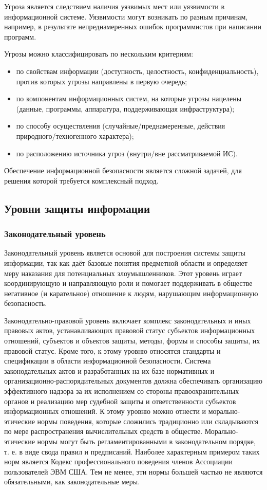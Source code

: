 Угроза является следствием наличия уязвимых мест или уязвимости в
информационной системе. Уязвимости могут возникать по разным причинам,
например, в результате непреднамеренных ошибок программистов при написании
программ.

\noindent Угрозы можно классифицировать по нескольким критериям:
\begin{itemize}
  \item по свойствам информации (доступность, целостность,
      конфиденциальность), против которых угрозы направлены в первую
      очередь;
  \item по компонентам информационных систем, на которые угрозы нацелены
      (данные, программы, аппаратура, поддерживающая инфраструктура);
  \item по способу осуществления (случайные/преднамеренные, действия
      природного/техногенного характера);
  \item по расположению источника угроз (внутри/вне рассматриваемой ИС).
\end{itemize}
Обеспечение информационной безопасности является сложной задачей, для решения
которой требуется комплексный подход.

\subsection{Уровни защиты информации}
\subsubsection{Законодательный уровень}
Законодательный уровень является основой для построения системы защиты
информации, так как даёт базовые понятия предметной области и определяет меру
наказания для потенциальных злоумышленников. Этот уровень играет
координирующую и направляющую роли и помогает поддерживать в обществе
негативное (и карательное) отношение к людям, нарушающим информационную
безопасность.

Законодательно-правовой уровень включает комплекс законодательных и иных
правовых актов, устанавливающих правовой статус субъектов информационных
отношений, субъектов и объектов защиты, методы, формы и способы защиты, их
правовой статус. Кроме того, к этому уровню относятся стандарты и
спецификации в области информационной безопасности. Система законодательных
актов и разработанных на их базе нормативных и
организационно-распорядительных документов должна обеспечивать организацию
эффективного надзора за их исполнением со стороны правоохранительных органов
и реализацию мер судебной защиты и ответственности субъектов информационных
отношений. К этому уровню можно отнести и морально-этические нормы поведения,
которые сложились традиционно или складываются по мере распространения
вычислительных средств в обществе. Морально-этические нормы могут быть
регламентированными в законодательном порядке, т. е. в виде свода правил и
предписаний. Наиболее характерным примером таких норм является Кодекс
профессионального поведения членов Ассоциации пользователей ЭВМ США. Тем не
менее, эти нормы большей частью не являются обязательными, как
законодательные меры.
